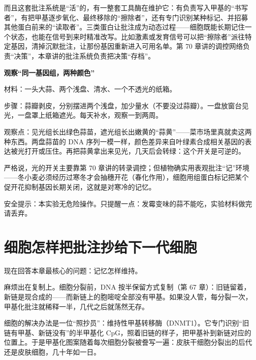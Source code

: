 而且这套批注系统是“活”的，有一整套工具酶在维护它：有负责写入甲基的“书写者”，有把甲基逐步氧化、最终移除的“擦除者”，还有专门识别某种标记、并招募其他蛋白前来的“读取者”。三类蛋白让批注成为动态过程——细胞既能长期记住一个状态，也能在信号到来时精准改写。比如激素或发育信号可以把“擦除者”派往特定基因，清掉沉默批注，让那份基因重新进入可用名单。第 70 章讲的调控网络负责“决策”，本章讲的批注系统负责把决策“存档”。

\begin{shiyan}
\textbf{观察“同一基因组，两种颜色”}

材料：一头大蒜、两个浅盘、清水、一个不透光的纸箱。

步骤：蒜瓣剥皮，分别摆进两个浅盘，加少量水（不要没过蒜瓣）。一盘放窗台见光，一盘罩上纸箱遮光。每天补水，观察一到两周。

观察点：见光组长出绿色蒜苗，遮光组长出嫩黄的“蒜黄”——菜市场里真就卖这两种东西。两盘蒜苗的 DNA 序列一模一样，颜色差异来自叶绿素合成相关基因的表达被光打开或压住。再把蒜黄拿出来见光，几天后会转绿：这个开关是可逆的。

严格说，光的开关主要靠第 70 章讲的转录调控；但植物确实用表观批注“记”环境——冬小麦必须经历过寒冬才会抽穗开花（春化作用），细胞用组蛋白标记把某个促开花抑制基因长期关闭，这就是对寒冷的记忆。

安全提示：本实验无危险操作。只提醒一点：发霉变味的蒜不能吃，实验材料做完请丢弃。
\end{shiyan}

\section{细胞怎样把批注抄给下一代细胞}

现在回答本章最核心的问题：记忆怎样维持。

麻烦出在复制上。细胞分裂前，DNA 按半保留方式复制（第 67 章）：旧链留着，新链是现合成的——而新链上的胞嘧啶全部没有甲基。如果没人管，每分裂一次，甲基化批注就稀释一半，几代之后就荡然无存。

细胞的解决办法是一位“照抄员”：维持性甲基转移酶（DNMT1）。它专门识别“旧链有甲基、新链没有”的半甲基化 CpG，照着旧链的样子，把甲基补到新链对应的位置上。于是甲基化图案随着每次细胞分裂被誊写一遍：皮肤干细胞分裂出的后代还是皮肤细胞，几十年如一日。


